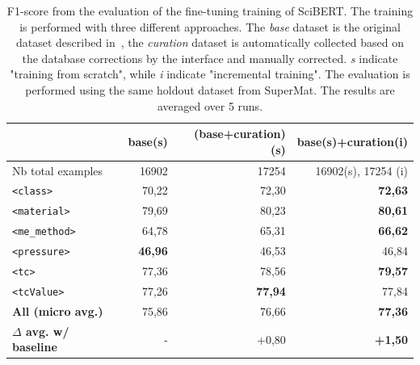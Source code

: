 \documentclass[a4paper]{article}
\begin{document}
\begin{table}[ht]
\centering\small
\begin{tabular}{lrrr}
\toprule
& \textbf{base}(s) & \textbf{(base+curation)(s)} & \textbf{base(s)+curation(i)} \\ 
\midrule
Nb total examples & 16902 & 17254 & 16902(s), 17254 (i)\\ 
\midrule
\texttt{<class>}        & 70,22             & 72,30             & \textbf{72,63} \\ 
\texttt{<material>}     & 79,69             & 80,23             & \textbf{80,61} \\ 
\texttt{<me\_method>}   & 64,78             & 65,31             & \textbf{66,62} \\ 
\texttt{<pressure>}     & \textbf{46,96}    & 46,53             & 46,84 \\ 
\texttt{<tc>}           & 77,36             & 78,56             & \textbf{79,57} \\ 
\texttt{<tcValue>}      & 77,26             & \textbf{77,94}    & 77,84 \\ 
\midrule
\textbf{All (micro avg.)} & 75,86           & 76,66             & \textbf{77,36} \\ 
\midrule
\textbf{$\Delta$ avg. w/ baseline}& -       & +0,80             & \textbf{+1,50} \\ 
\bottomrule
\end{tabular}
\caption{F1-score from the evaluation of the fine-tuning training of SciBERT. The training is performed with three different approaches. 
The \emph{base} dataset is the original dataset described in~\cite{lfoppiano2023automatic}, the \emph{curation} dataset is automatically collected based on the database corrections by the interface and manually corrected. \textit{s} indicate "training from scratch", while \textit{i} indicate "incremental training". 
The evaluation is performed using the same holdout dataset from SuperMat. 
The results are averaged over 5 runs. }
\label{tab:evaluation-curation-training}
\end{table}
\end{document}
